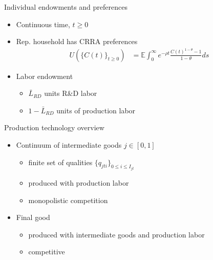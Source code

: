 \documentclass[english,usenames,dvipsnames]{beamer}
\begin{document}
\begin{frame}{Individual endowments and preferences}
	\begin{itemize}
		\item Continuous time, $t \ge 0$
		\item Rep. household has CRRA preferences 
		\begin{align*}
		U(\{C(t)\}_{t \ge 0}) &= \mathbb{E} \int_0^{\infty} e^{-\rho t} \frac{C(t)^{1-\theta} - 1}{1 - \theta} ds
		\end{align*}
		\item Labor endowment
		\begin{itemize}
			\item $\bar{L}_{RD}$ units R\&D labor
			\item $1 - \bar{L}_{RD}$ units of production labor
		\end{itemize}
	\end{itemize}
\end{frame}

\begin{frame}{Production technology overview}
	\begin{itemize}
		\item Continuum of intermediate goods $j \in [0,1]$ 
		\begin{itemize}
			\item finite set of qualities $\{q_{jti}\}_{0 \le i \le I_{jt}}$
			\item produced with production labor 
			\item monopolistic competition
		\end{itemize}
		\smallskip
		\item Final good
		\begin{itemize}
			\item produced with intermediate goods and production labor
			\item competitive
		\end{itemize}
	\end{itemize}
\end{frame}
\end{document}
